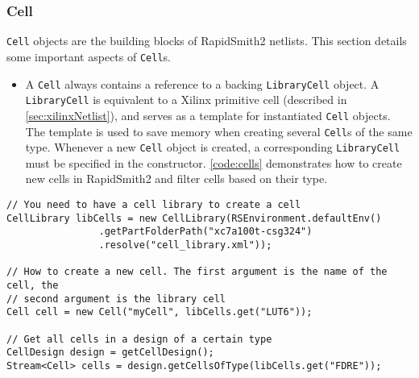 \subsubsection{Cell}
\texttt{Cell} objects are the building blocks of RapidSmith2 netlists. This
section details some important aspects of \texttt{Cell}s.

\begin {itemize}
  \item A \texttt{Cell} always contains a reference to a backing
  \texttt{LibraryCell} object. A \texttt{LibraryCell} is equivalent to a Xilinx
  primitive cell (described in \autoref{sec:xilinxNetlist}), and serves as a
  template for instantiated \texttt{Cell} objects. The template is used to save
  memory when creating several \texttt{Cell}s of the same type. Whenever a new
  \texttt{Cell} object is created, a corresponding \texttt{LibraryCell} must be
  specified in the constructor. \autoref{code:cells} demonstrates how to create
  new cells in RapidSmith2 and filter cells based on their type.
\end {itemize}  

\begin{lstlisting}[xleftmargin=1.5em, framexleftmargin=1.5em, caption=How to
create new cells in RapidSmith2, label=code:cells] 
// You need to have a cell library to create a cell
CellLibrary libCells = new CellLibrary(RSEnvironment.defaultEnv()
				.getPartFolderPath("xc7a100t-csg324")
				.resolve("cell_library.xml"));

// How to create a new cell. The first argument is the name of the cell, the
// second argument is the library cell
Cell cell = new Cell("myCell", libCells.get("LUT6"));

// Get all cells in a design of a certain type
CellDesign design = getCellDesign();
Stream<Cell> cells = design.getCellsOfType(libCells.get("FDRE"));
\end{lstlisting}

